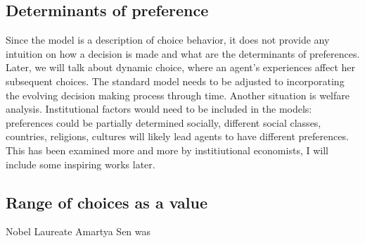 \subsection{Determinants of preference}
Since the model is a description of choice behavior, it does not provide any intuition on how a decision is made and what are the determinants of preferences. Later, we will talk about dynamic choice, where an agent's experiences affect her subsequent choices.
The standard model needs to be adjusted to incorporating the evolving decision making process through time. Another situation is welfare analysis. Institutional factors would need to be included in the models: preferences could be partially determined socially,
different social classes, countries, religions, cultures will likely lead agents to have different preferences. This has been examined more and more by institiutional economists, I will include some inspiring works later.

\subsection{Range of choices as a value}
Nobel Laureate Amartya Sen was 